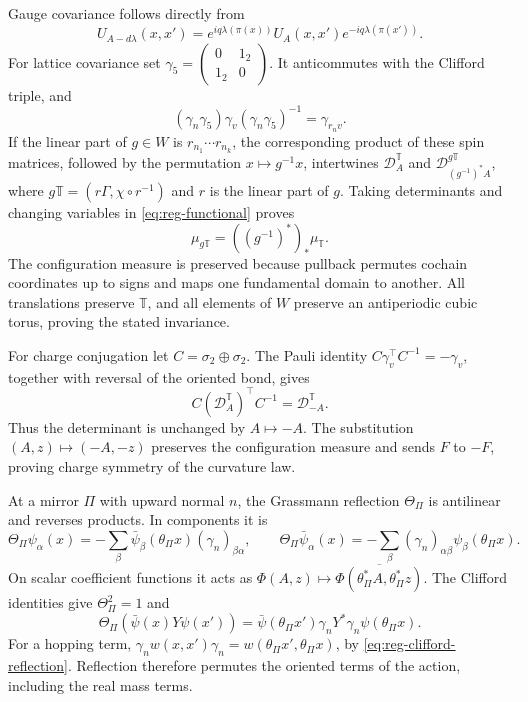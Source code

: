 Gauge covariance follows directly from
\[
 U_{A-d\lambda}(x,x')
 =e^{iq\lambda(\pi(x))}U_A(x,x')e^{-iq\lambda(\pi(x'))}.
\]
For lattice covariance set
$\gamma_5=\left(\begin{smallmatrix}0&1_2\\1_2&0\end{smallmatrix}\right)$.
It anticommutes with the Clifford triple, and
\[
 (\gamma_n\gamma_5)\gamma_v(\gamma_n\gamma_5)^{-1}
 =\gamma_{r_nv}.
\]
If the linear part of $g\in W$ is $r_{n_1}\cdots r_{n_k}$, the
corresponding product of these spin matrices, followed by the
permutation $x\mapsto g^{-1}x$, intertwines $\mathcal D_A^{\mathbb T}$ and
$\mathcal D_{(g^{-1})^*A}^{g\mathbb T}$, where
$g\mathbb T=(r\Gamma,\chi\circ r^{-1})$ and $r$ is the linear part
of $g$. Taking determinants and changing
variables in \eqref{eq:reg-functional} proves
\[
 \mu_{g\mathbb T}=((g^{-1})^*)_*\mu_{\mathbb T}.
\]
The configuration measure is preserved because pullback permutes
cochain coordinates up to signs and maps one fundamental domain
to another. All translations preserve $\mathbb T$, and all elements
of $W$ preserve an antiperiodic cubic torus, proving the stated
invariance.

For charge conjugation let $C=\sigma_2\oplus\sigma_2$. The Pauli
identity $C\gamma_v^\top C^{-1}=-\gamma_v$, together with reversal
of the oriented bond, gives
\[
 C(\mathcal D_A^{\mathbb T})^\top C^{-1}=\mathcal D_{-A}^{\mathbb T}.
\]
Thus the determinant is unchanged by $A\mapsto-A$. The substitution
$(A,z)\mapsto(-A,-z)$ preserves the configuration measure and sends
$F$ to $-F$, proving charge symmetry of the curvature law.

At a mirror $\Pi$ with upward normal $n$, the Grassmann reflection
$\Theta_\Pi$ is antilinear and reverses products. In components it is
\begin{equation}\label{eq:reg-grassmann-reflection}
 \Theta_\Pi\psi_\alpha(x)
  =-\sum_\beta\bar\psi_\beta(\theta_\Pi x)(\gamma_n)_{\beta\alpha},
 \qquad
 \Theta_\Pi\bar\psi_\alpha(x)
  =-\sum_\beta(\gamma_n)_{\alpha\beta}\psi_\beta(\theta_\Pi x).
\end{equation}
On scalar coefficient functions it acts as
$\Phi(A,z)\mapsto\overline{\Phi(\theta_\Pi^*A,\theta_\Pi^*z)}$.
The Clifford identities give $\Theta_\Pi^2=1$ and
\begin{equation}\label{eq:reg-reflected-bilinear}
 \Theta_\Pi(\bar\psi(x)Y\psi(x'))
 =\bar\psi(\theta_\Pi x')\gamma_nY^*\gamma_n\psi(\theta_\Pi x).
\end{equation}
For a hopping term,
$\gamma_nw(x,x')\gamma_n=w(\theta_\Pi x',\theta_\Pi x)$, by
\eqref{eq:reg-clifford-reflection}. Reflection therefore permutes the
oriented terms of the action, including the real mass terms.

